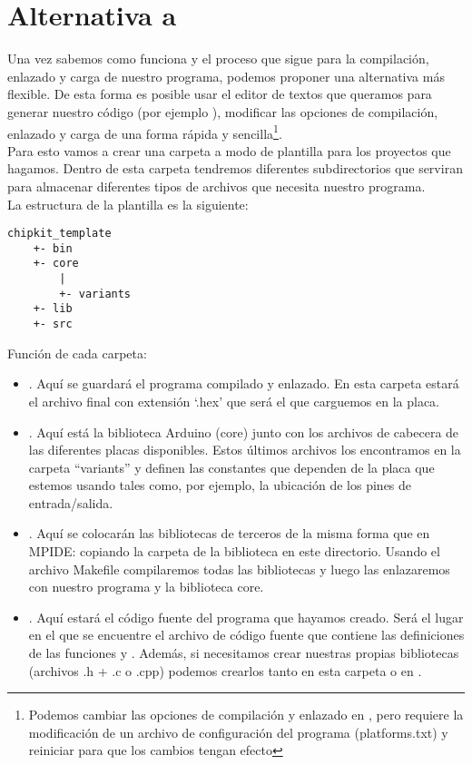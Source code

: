 \newpage

\section{Alternativa a }

Una vez sabemos como funciona  y el proceso que sigue para la compilación, enlazado y carga de nuestro programa, podemos proponer una alternativa más flexible.  
De esta forma es posible usar el editor de textos que queramos para generar nuestro código (por ejemplo ), modificar las opciones de compilación, enlazado y carga de una forma rápida y sencilla\protect\footnote{Podemos cambiar las opciones de compilación y enlazado en , pero requiere la modificación de un archivo de configuración del programa (platforms.txt) y reiniciar  para que los cambios tengan efecto}.\\
Para esto vamos a crear una carpeta a modo de plantilla para los proyectos que hagamos. Dentro de esta carpeta tendremos diferentes subdirectorios que serviran para almacenar diferentes tipos de archivos que necesita nuestro programa.\\
La estructura de la plantilla es la siguiente:
\begin{lstlisting}
chipkit_template
	+- bin
	+- core
	    |
	    +- variants
	+- lib
	+- src
\end{lstlisting}

Función de cada carpeta:
\begin{itemize}
	\item {}. Aquí se guardará el programa compilado y enlazado. En esta carpeta estará el archivo final con extensión `.hex' que será el que carguemos en la placa.
	\item {}. Aquí está la biblioteca Arduino (core) junto con los archivos de cabecera de las diferentes placas disponibles. Estos últimos archivos los encontramos en la carpeta ``variants'' y definen las constantes que dependen de la placa que estemos usando tales como, por ejemplo, la ubicación de los pines de entrada/salida.
	\item {}. Aquí se colocarán las bibliotecas de terceros de la misma forma que en MPIDE: copiando la carpeta de la biblioteca en este directorio. Usando el archivo Makefile compilaremos todas las bibliotecas y luego las enlazaremos con nuestro programa y la biblioteca core.
	\item {}. Aquí estará el código fuente del programa que hayamos creado. Será el lugar en el que se encuentre el archivo de código fuente  que contiene las definiciones de las funciones  y . Además, si necesitamos crear nuestras propias bibliotecas (archivos .h + .c o .cpp) podemos crearlos tanto en esta carpeta o en .
\end{itemize}

